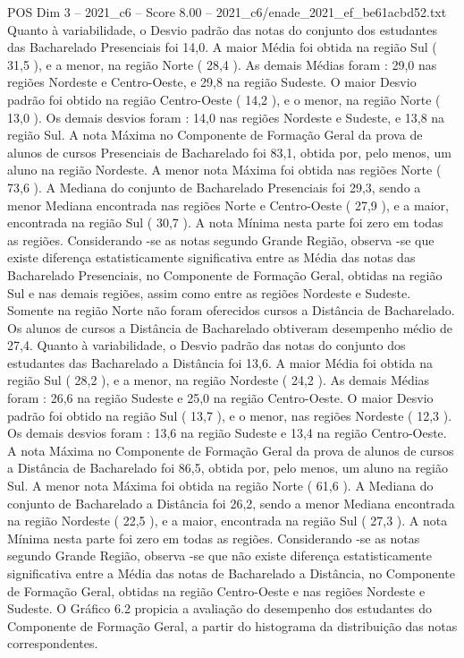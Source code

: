 \begin{textsample}{POS Dim 3 – 2021\_c6 – Score 8.00 – 2021\_c6/enade\_2021\_ef\_be61acbd52.txt}
Quanto à variabilidade, o Desvio padrão das notas do conjunto dos estudantes das Bacharelado Presenciais foi 14,0.
A maior Média foi obtida na região Sul ( 31,5 ), e a menor, na região Norte ( 28,4 ).
As demais Médias foram : 29,0 nas regiões Nordeste e Centro-Oeste, e 29,8 na região Sudeste.
O maior Desvio padrão foi obtido na região Centro-Oeste ( 14,2 ), e o menor, na região Norte ( 13,0 ).
Os demais desvios foram : 14,0 nas regiões Nordeste e Sudeste, e 13,8 na região Sul.
A nota Máxima no Componente de Formação Geral da prova de alunos de cursos Presenciais de Bacharelado foi 83,1, obtida por, pelo menos, um aluno na região Nordeste.
A menor nota Máxima foi obtida nas regiões Norte ( 73,6 ).
A Mediana do conjunto de Bacharelado Presenciais foi 29,3, sendo a menor Mediana encontrada nas regiões Norte e Centro-Oeste ( 27,9 ), e a maior, encontrada na região Sul ( 30,7 ).
A nota Mínima nesta parte foi zero em todas as regiões.
Considerando -se as notas segundo Grande Região, observa -se que existe diferença estatisticamente significativa entre as Média das notas das Bacharelado Presenciais, no Componente de Formação Geral, obtidas na região Sul e nas demais regiões, assim como entre as regiões Nordeste e Sudeste.
Somente na região Norte não foram oferecidos cursos a Distância de Bacharelado.
Os alunos de cursos a Distância de Bacharelado obtiveram desempenho médio de 27,4.
Quanto à variabilidade, o Desvio padrão das notas do conjunto dos estudantes das Bacharelado a Distância foi 13,6.
A maior Média foi obtida na região Sul ( 28,2 ), e a menor, na região Nordeste ( 24,2 ).
As demais Médias foram : 26,6 na região Sudeste e 25,0 na região Centro-Oeste.
O maior Desvio padrão foi obtido na região Sul ( 13,7 ), e o menor, nas regiões Nordeste ( 12,3 ).
Os demais desvios foram : 13,6 na região Sudeste e 13,4 na região Centro-Oeste.
A nota Máxima no Componente de Formação Geral da prova de alunos de cursos a Distância de Bacharelado foi 86,5, obtida por, pelo menos, um aluno na região Sul.
A menor nota Máxima foi obtida na região Norte ( 61,6 ).
A Mediana do conjunto de Bacharelado a Distância foi 26,2, sendo a menor Mediana encontrada na região Nordeste ( 22,5 ), e a maior, encontrada na região Sul ( 27,3 ).
A nota Mínima nesta parte foi zero em todas as regiões.
Considerando -se as notas segundo Grande Região, observa -se que não existe diferença estatisticamente significativa entre a Média das notas de Bacharelado a Distância, no Componente de Formação Geral, obtidas na região Centro-Oeste e nas regiões Nordeste e Sudeste.
O Gráfico 6.2 propicia a avaliação do desempenho dos estudantes do Componente de Formação Geral, a partir do histograma da distribuição das notas correspondentes.

\end{textsample}
